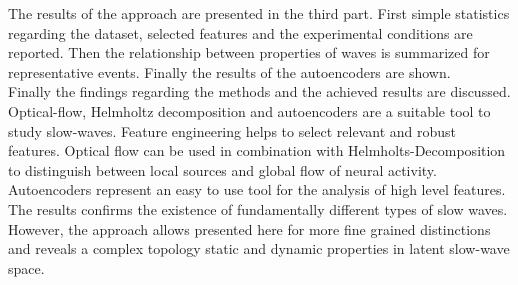 The results of the approach are presented in the third part. First simple statistics regarding the dataset, selected features and the experimental conditions are reported. Then the relationship between properties of waves is summarized for representative events. Finally the results of the autoencoders are shown. \\
Finally the findings regarding the methods and the achieved results are discussed. Optical-flow, Helmholtz decomposition and autoencoders are a suitable tool to study slow-waves. Feature engineering helps to select relevant and robust features. Optical flow can be used in combination with Helmholts-Decomposition to distinguish between local sources and global flow of neural activity. Autoencoders represent an easy to use tool for the analysis of high level features. The results confirms the existence of fundamentally different types of slow waves. However, the approach allows presented here for more fine grained distinctions and reveals a complex topology static and dynamic properties in latent slow-wave space.\\

